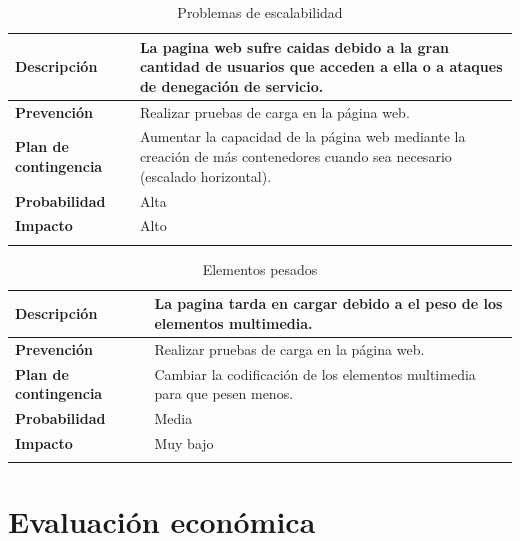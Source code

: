 \documentclass{report}
\begin{document}
        \begin{center}
            \begin{longtable}{|p{6cm}|p{6cm}|}
                \hline
                \textbf{Descripción} & La pagina web sufre caidas debido a la gran cantidad de usuarios que acceden a ella o a ataques de denegación de servicio.\\
                \hline
                \textbf{Prevención} & Realizar pruebas de carga en la página web.\\
                \hline
                \textbf{Plan de contingencia} & Aumentar la capacidad de la página web mediante la creación de más contenedores cuando sea necesario (escalado horizontal).\\
                \hline
                \textbf{Probabilidad} & Alta\\
                \hline
                \textbf{Impacto} & Alto\\
                \hline
                \caption{Problemas de escalabilidad}
            \end{longtable}
        \end{center}
        \begin{center}
            \begin{longtable}{|p{6cm}|p{6cm}|}
                \hline
                \textbf{Descripción} & La pagina tarda en cargar debido a el peso de los elementos multimedia.\\
                \hline
                \textbf{Prevención} & Realizar pruebas de carga en la página web.\\
                \hline
                \textbf{Plan de contingencia} & Cambiar la codificación de los elementos multimedia para que pesen menos.\\
                \hline
                \textbf{Probabilidad} & Media\\
                \hline
                \textbf{Impacto} & Muy bajo\\
                \hline
                \caption{Elementos pesados}
            \end{longtable}
        \end{center}
    \chapter{Evaluación económica}
\end{document}
